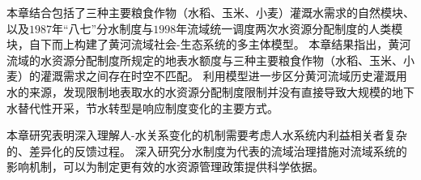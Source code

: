 本章结合包括了三种主要粮食作物（水稻、玉米、小麦）灌溉水需求的自然模块、以及$1987$年“八七”分水制度与$1998$年流域统一调度两次水资源分配制度的人类模块，自下而上构建了黄河流域社会-生态系统的多主体模型。
本章结果指出，黄河流域的水资源分配制度所规定的地表水额度与三种主要粮食作物（水稻、玉米、小麦）的灌溉需求之间存在时空不匹配。
利用模型进一步区分黄河流域历史灌溉用水的来源，发现限制地表取水的水资源分配制度限制并没有直接导致大规模的地下水替代性开采，节水转型是响应制度变化的主要方式。

本章研究表明深入理解人-水关系变化的机制需要考虑人水系统内利益相关者复杂的、差异化的反馈过程。
深入研究分水制度为代表的流域治理措施对流域系统的影响机制，可以为制定更有效的水资源管理政策提供科学依据。
